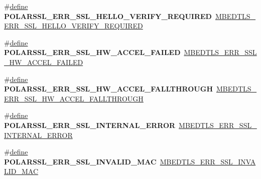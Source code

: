 \begin{DoxyCompactItemize}
\item 
\mbox{\label{compat-1_83_8h_abe8142da70fb62e96b0e0112f0adb28c}} 
\#\hyperlink{structdefine}{define} {\bfseries P\+O\+L\+A\+R\+S\+S\+L\+\_\+\+E\+R\+R\+\_\+\+S\+S\+L\+\_\+\+H\+E\+L\+L\+O\+\_\+\+V\+E\+R\+I\+F\+Y\+\_\+\+R\+E\+Q\+U\+I\+R\+ED}~\hyperlink{ssl_8h_a18d6936a834082004d1b1d16fe0007a2}{M\+B\+E\+D\+T\+L\+S\+\_\+\+E\+R\+R\+\_\+\+S\+S\+L\+\_\+\+H\+E\+L\+L\+O\+\_\+\+V\+E\+R\+I\+F\+Y\+\_\+\+R\+E\+Q\+U\+I\+R\+ED}
\item 
\mbox{\label{compat-1_83_8h_a5241d228f234e307b60bc13139eab2fc}} 
\#\hyperlink{structdefine}{define} {\bfseries P\+O\+L\+A\+R\+S\+S\+L\+\_\+\+E\+R\+R\+\_\+\+S\+S\+L\+\_\+\+H\+W\+\_\+\+A\+C\+C\+E\+L\+\_\+\+F\+A\+I\+L\+ED}~\hyperlink{ssl_8h_aef773c241760a00e92c239a917e4868e}{M\+B\+E\+D\+T\+L\+S\+\_\+\+E\+R\+R\+\_\+\+S\+S\+L\+\_\+\+H\+W\+\_\+\+A\+C\+C\+E\+L\+\_\+\+F\+A\+I\+L\+ED}
\item 
\mbox{\label{compat-1_83_8h_a45a9cd8b2cb96afeed543fc57078e7d8}} 
\#\hyperlink{structdefine}{define} {\bfseries P\+O\+L\+A\+R\+S\+S\+L\+\_\+\+E\+R\+R\+\_\+\+S\+S\+L\+\_\+\+H\+W\+\_\+\+A\+C\+C\+E\+L\+\_\+\+F\+A\+L\+L\+T\+H\+R\+O\+U\+GH}~\hyperlink{ssl_8h_af9328fb82f9548f4fa6bf3a5e1254c65}{M\+B\+E\+D\+T\+L\+S\+\_\+\+E\+R\+R\+\_\+\+S\+S\+L\+\_\+\+H\+W\+\_\+\+A\+C\+C\+E\+L\+\_\+\+F\+A\+L\+L\+T\+H\+R\+O\+U\+GH}
\item 
\mbox{\label{compat-1_83_8h_a13e4844a3fd06c7dc142f5b8f3985115}} 
\#\hyperlink{structdefine}{define} {\bfseries P\+O\+L\+A\+R\+S\+S\+L\+\_\+\+E\+R\+R\+\_\+\+S\+S\+L\+\_\+\+I\+N\+T\+E\+R\+N\+A\+L\+\_\+\+E\+R\+R\+OR}~\hyperlink{ssl_8h_af06cd02b5bcd36592925c2f63d80f43f}{M\+B\+E\+D\+T\+L\+S\+\_\+\+E\+R\+R\+\_\+\+S\+S\+L\+\_\+\+I\+N\+T\+E\+R\+N\+A\+L\+\_\+\+E\+R\+R\+OR}
\item 
\mbox{\label{compat-1_83_8h_ac8b3452c48a066a22c809a9d60bc3752}} 
\#\hyperlink{structdefine}{define} {\bfseries P\+O\+L\+A\+R\+S\+S\+L\+\_\+\+E\+R\+R\+\_\+\+S\+S\+L\+\_\+\+I\+N\+V\+A\+L\+I\+D\+\_\+\+M\+AC}~\hyperlink{ssl_8h_ac88e465f67430fba26abeb44f2ac28d5}{M\+B\+E\+D\+T\+L\+S\+\_\+\+E\+R\+R\+\_\+\+S\+S\+L\+\_\+\+I\+N\+V\+A\+L\+I\+D\+\_\+\+M\+AC}
\item 
\mbox{\label{compat-1_83_8h_a6a1584fe2b857e6d374d086768aaa6b8}} 

\end{DoxyCompactItemize}
